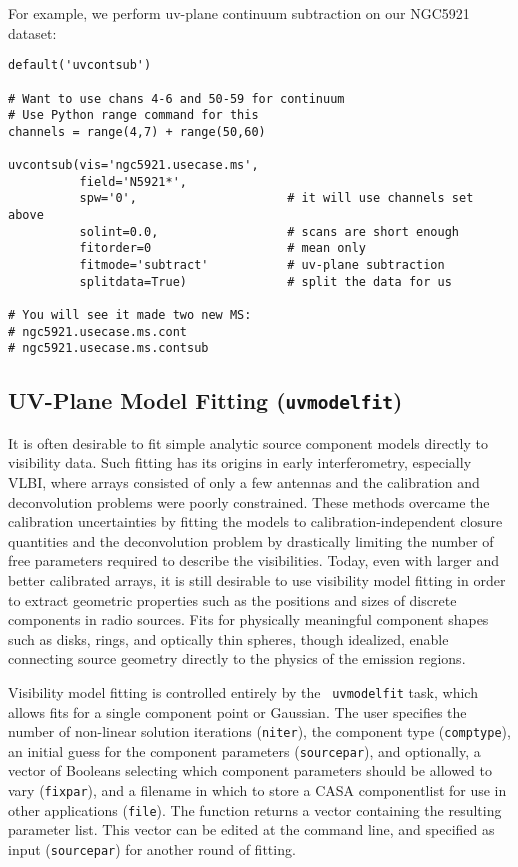 For example, we perform uv-plane continuum subtraction on our
NGC5921 dataset:
\small
\begin{verbatim}
default('uvcontsub')

# Want to use chans 4-6 and 50-59 for continuum
# Use Python range command for this
channels = range(4,7) + range(50,60)

uvcontsub(vis='ngc5921.usecase.ms',
          field='N5921*',
          spw='0',                     # it will use channels set above
          solint=0.0,                  # scans are short enough
          fitorder=0                   # mean only
          fitmode='subtract'           # uv-plane subtraction
          splitdata=True)              # split the data for us

# You will see it made two new MS:
# ngc5921.usecase.ms.cont
# ngc5921.usecase.ms.contsub
\end{verbatim}
\normalsize

\subsection{UV-Plane Model Fitting ({\tt uvmodelfit})}
\label{section:cal.other.uvmodelfit}

It is often desirable to fit simple analytic source component models
directly to visibility data.  Such fitting has its origins in early
interferometry, especially VLBI, where arrays consisted of only a few
antennas and the calibration and deconvolution problems were poorly
constrained.  These methods overcame the calibration uncertainties by
fitting the models to calibration-independent closure quantities and
the deconvolution problem by drastically limiting the number of free
parameters required to describe the visibilities.  Today, even with
larger and better calibrated arrays, it is still desirable to use
visibility model fitting in order to extract geometric properties such
as the positions and sizes of discrete components in radio sources.
Fits for physically meaningful component shapes such as disks, rings,
and optically thin spheres, though idealized, enable connecting source
geometry directly to the physics of the emission regions.

Visibility model fitting is controlled entirely by the {\tt
uvmodelfit} task, which allows fits for a single component point or
Gaussian.  The user specifies the number of non-linear solution
iterations ({\tt niter}), the component type ({\tt comptype}), an
initial guess for the component parameters ({\tt sourcepar}), and
optionally, a vector of Booleans selecting which component parameters
should be allowed to vary ({\tt fixpar}), and a filename in which to
store a CASA componentlist for use in other applications ({\tt file}).
The function returns a vector containing the resulting parameter list.
This vector can be edited at the command line, and specified as input
({\tt sourcepar}) for another round of fitting.

